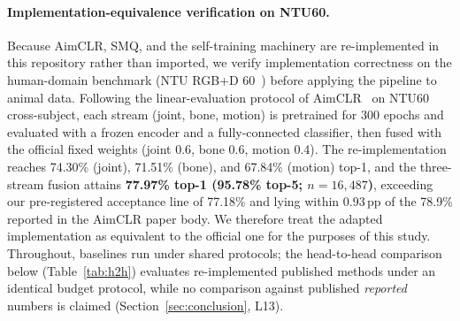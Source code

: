 \paragraph{Implementation-equivalence verification on NTU60.}
Because AimCLR, SMQ, and the self-training machinery are re-implemented in this repository rather than imported, we verify implementation correctness on the human-domain benchmark (NTU RGB+D 60~\citep{shahroudy2016ntu}) before applying the pipeline to animal data. Following the linear-evaluation protocol of AimCLR~\citep{guo2022aimclr} on NTU60 cross-subject, each stream (joint, bone, motion) is pretrained for 300 epochs and evaluated with a frozen encoder and a fully-connected classifier, then fused with the official fixed weights (joint 0.6, bone 0.6, motion 0.4). The re-implementation reaches 74.30\% (joint), 71.51\% (bone), and 67.84\% (motion) top-1, and the three-stream fusion attains \textbf{77.97\% top-1 (95.78\% top-5; $n=16{,}487$)}, exceeding our pre-registered acceptance line of 77.18\% and lying within 0.93\,pp of the 78.9\% reported in the AimCLR paper body. We therefore treat the adapted implementation as equivalent to the official one for the purposes of this study. Throughout, baselines run under shared protocols; the head-to-head comparison below (Table~\ref{tab:h2h}) evaluates re-implemented published methods under an identical budget protocol, while no comparison against published \emph{reported} numbers is claimed (Section~\ref{sec:conclusion}, L13).

